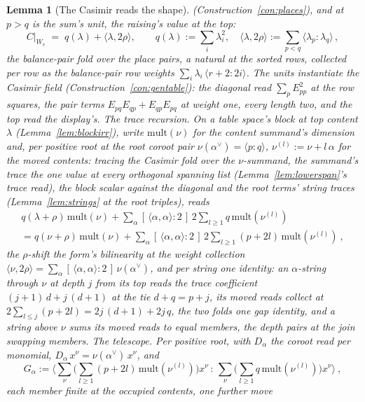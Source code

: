 \documentclass[11pt]{article}
\newtheorem{lemma}{Lemma}
\theoremstyle{definition}
\begin{document}
\begin{lemma}[The Casimir reads the shape]
(Construction~\ref{con:places}),
and at $p>q$ is the sum's unit, the raising's value at the top:
\[
C\big|_{W_v}\;=\;q(\lambda)+\langle\lambda,2\rho\rangle ,
\qquad
q(\lambda):=\sum_i\lambda_i^2,\quad
\langle\lambda,2\rho\rangle:=\sum_{p<q}
\langle\lambda_p\!:\!\lambda_q\rangle\,,
\]
the balance-pair fold over the place pairs, a natural at the sorted
rows, collected per row as the balance-pair row weights
$\sum_i\lambda_i\,\langle r+2\!:\!2i\rangle$.
The units instantiate the Casimir field
(Construction~\ref{con:gentable}): the diagonal read
$\sum_pE_{pp}^2$ at the row squares, the pair terms
$E_{pq}E_{qp}+E_{qp}E_{pq}$ at weight one, every length two, and
the top read the display's.
\emph{The trace recursion.} On a table space's block at top
content $\lambda$ (Lemma~\ref{lem:blockirr}), write
$\mathrm{mult}(\nu)$ for the content summand's dimension and, per
positive root at the root coroot pair
$\nu(\alpha^\vee)=\langle p\!:\!q\rangle$,
$\nu^{(l)}:=\nu+l\,\alpha$ for the moved contents: tracing the
Casimir fold over the $\nu$-summand, the summand's trace the one
value at every orthogonal spanning list
(Lemma~\ref{lem:lowerspan}'s trace read), the block scalar against
the diagonal and the root terms' string traces
(Lemma~\ref{lem:strings} at the root triples), reads
\begin{multline*}
q(\lambda{+}\rho)\,\mathrm{mult}(\nu)
+\sum_{\alpha}[\,\langle\alpha,\alpha\rangle:2\,]\,
2\sum_{l\ge1}q\,\mathrm{mult}(\nu^{(l)})\\
=
q(\nu{+}\rho)\,\mathrm{mult}(\nu)
+\sum_{\alpha}[\,\langle\alpha,\alpha\rangle:2\,]\,
2\sum_{l\ge1}(p{+}2l)\,\mathrm{mult}(\nu^{(l)})\ ,
\end{multline*}
the $\rho$-shift the form's bilinearity at the weight collection
$\langle\nu,2\rho\rangle=\sum_\alpha
[\,\langle\alpha,\alpha\rangle:2\,]\,\nu(\alpha^\vee)$, and per
string one identity: an $\alpha$-string through $\nu$ at depth
$j$ from its top reads the trace coefficient
$(j{+}1)\,d+j\,(d{+}1)$ at the tie $d+q=p+j$, its moved reads
collect at $2\sum_{l\le j}(p{+}2l)=2j\,(d{+}1)+2j\,q$, the two
folds one gap identity, and a string above $\nu$ sums its moved
reads to equal members, the depth pairs at the join swapping
members. \emph{The telescope.} Per positive root, with
$D_\alpha$ the coroot read per monomial,
$D_\alpha\,x^\nu=\nu(\alpha^\vee)\,x^\nu$, and
\[
G_\alpha:=\Big\langle\sum_\nu\Big(\sum_{l\ge1}(p{+}2l)\,
\mathrm{mult}(\nu^{(l)})\Big)x^\nu\,:\,\sum_\nu\Big(\sum_{l\ge1}
q\,\mathrm{mult}(\nu^{(l)})\Big)x^\nu\Big\rangle\ ,
\]
each member finite at the occupied contents, one further move

\end{lemma}
\end{document}
